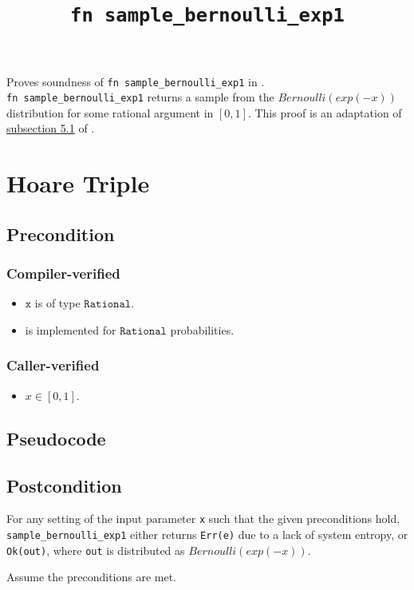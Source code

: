 \documentclass{article}
\title{\texttt{fn sample\_bernoulli\_exp1}}
\author{\MichaelShoemateAuthor}
\begin{document}
\maketitle
\contrib
Proves soundness of \texttt{fn sample\_bernoulli\_exp1} in .\\
\texttt{fn sample\_bernoulli\_exp1} returns a sample from the $Bernoulli(exp(-x))$ distribution for some rational argument in $[0, 1]$.
This proof is an adaptation of \href{https://arxiv.org/pdf/2004.00010.pdf#subsection.5.1}{subsection 5.1} of \cite{CKS20}.

\section{Hoare Triple}
\subsection*{Precondition}
\subsubsection*{Compiler-verified}
\begin{itemize}
    \item $\texttt{x}$ is of type $\texttt{Rational}$.
    \item {} is implemented for $\texttt{Rational}$ probabilities.
\end{itemize}

\subsubsection*{Caller-verified}
\begin{itemize}
    \item $x \in [0, 1]$.
\end{itemize}

\subsection*{Pseudocode}


\subsection*{Postcondition}
\begin{theorem}
\label{postcondition}
For any setting of the input parameter \texttt{x} such that the given preconditions hold, \\
\texttt{sample\_bernoulli\_exp1} either returns \texttt{Err(e)} due to a lack of system entropy,
or \texttt{Ok(out)}, where \texttt{out} is distributed as $Bernoulli(exp(-x))$.
\end{theorem}
Assume the preconditions are met.
\end{document}
